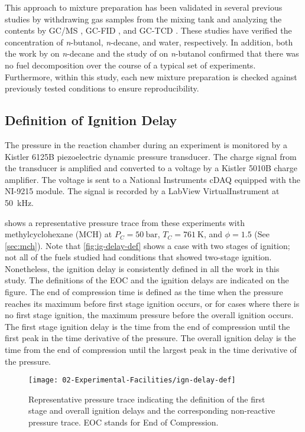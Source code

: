 \documentclass[../main.tex]{subfiles}
\begin{document}
This approach to mixture preparation has been validated in several previous
studies by withdrawing gas samples from the mixing tank and analyzing the
contents by GC/MS \cite{Weber2011}, GC-FID \cite{Kumar2009}, and GC-TCD
\cite{Das2012}. These studies have verified the concentration of
\textit{n}-butanol, \textit{n}-decane, and water, respectively. In addition,
both the work by \textcite{Kumar2009} on \textit{n}-decane and the study of
\textcite{Weber2011} on \textit{n}-butanol confirmed that there was no fuel
decomposition over the course of a typical set of experiments. Furthermore,
within this study, each new mixture preparation is checked against previously
tested conditions to ensure reproducibility.

\subsection{Definition of Ignition Delay}
\label{sec:ig-delay-def}

The pressure in the reaction chamber during an experiment is monitored by a
Kistler 6125B piezoelectric dynamic pressure transducer. The charge signal from the
transducer is amplified and converted to a voltage by a Kistler 5010B charge amplifier.
The voltage is sent to a National Instruments cDAQ equipped with the NI-9215 module.
The signal is recorded by a LabView VirtualInstrument at \SI{50}{\kilo\hertz}.

 shows a representative pressure trace from
these experiments with methylcyclohexane (MCH) at $P_C= \SI{50}{\bar}$, $T_C=\SI{761}{\kelvin}$,
and $\phi=\num{1.5}$ (See \autoref{sec:mch}). Note that \autoref{fig:ig-delay-def}
shows a case with two stages of ignition; not all of the fuels studied
had conditions that showed two-stage ignition. Nonetheless, the ignition
delay is consistently defined in all the work in this study. The
definitions of the EOC and the ignition delays are indicated on the figure.
The end of compression time is defined as the time when the pressure
reaches its maximum before first stage ignition occurs, or for cases
where there is no first stage ignition, the maximum pressure before
the overall ignition occurs. The first stage ignition delay is the time
from the end of compression until the first peak in the time derivative
of the pressure. The overall ignition delay is the time from the end of
compression until the largest peak in the time derivative of the pressure.

\begin{figure}
    \texttt{[image: 02-Experimental-Facilities/ign-delay-def]}
    \caption{Representative pressure trace indicating the definition of
    the first stage and overall ignition delays and the corresponding
    non-reactive pressure trace. EOC stands for End of Compression.}
    \label{fig:ig-delay-def}
\end{figure}
\end{document}
